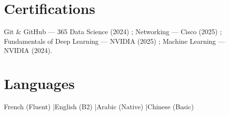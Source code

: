\documentclass[a4paper,10pt]{article}
\begin{document}
\section{Certifications}
Git \& GitHub --- 365 Data Science (2024) ; Networking --- Cisco (2025) ; Fundamentals of Deep Learning --- NVIDIA (2025) ; Machine Learning --- NVIDIA (2024).
\section{Languages}
French (Fluent) \quad|\quad English (B2) \quad|\quad Arabic (Native) \quad|\quad Chinese (Basic)
\end{document}
